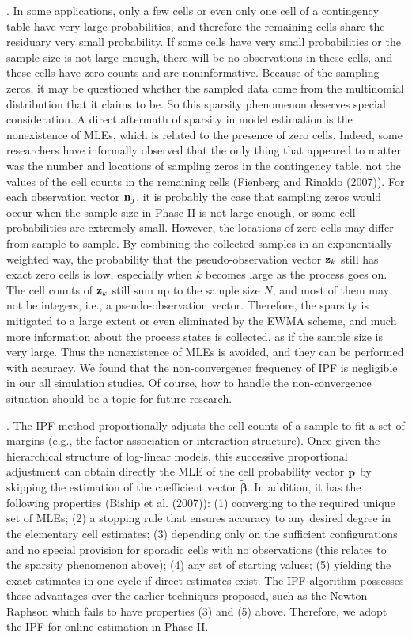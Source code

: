 . In some applications, only a few cells or even only one
cell of a contingency table have very large probabilities, and therefore the
remaining cells share the residuary very small probability. If some cells have very
small probabilities or the sample size is not large enough, there will be no
observations in these cells, and these cells have zero counts and are
noninformative. Because of the sampling zeros, it may be questioned whether the
sampled data come from the multinomial distribution that it claims to be. So this
sparsity phenomenon deserves special consideration. A direct aftermath of sparsity
in model estimation is the nonexistence of MLEs, which is related to the presence of
zero cells. Indeed, some researchers have informally observed that the only thing
that appeared to matter was the number and locations of sampling zeros in the
contingency table, not the values of the cell counts in the remaining cells
(Fienberg and Rinaldo (2007)). For each observation vector ${\bf n}_j$, it is
probably the case that sampling zeros would occur when the sample size in Phase II
is not large enough, or some cell probabilities are extremely small. However, the
locations of zero cells may differ from sample to sample. By combining the collected
samples in an exponentially weighted way, the probability that the
pseudo-observation vector ${\bf z}_k$ still has exact zero cells is low, especially
when $k$ becomes large as the process goes on. The cell counts of ${\bf z}_k$ still
sum up to the sample size $N$, and most of them may not be integers, i.e., a
pseudo-observation vector. Therefore, the sparsity is mitigated to a large extent or
even eliminated by the EWMA scheme, and much more information about the process
states is collected, as if the sample size is very large. Thus the nonexistence of
MLEs is avoided, and they can be performed with accuracy. We found that the
non-convergence frequency of IPF is negligible in our all simulation studies. Of
course, how to handle the non-convergence situation should be a topic for future
research.

. The IPF method proportionally adjusts the cell counts of a
sample to fit a set of margins (e.g., the factor association or interaction
structure). Once given the hierarchical structure of log-linear models, this
successive proportional adjustment can obtain directly the MLE of the cell
probability vector $\bf p$ by skipping the estimation of the coefficient vector
$\widetilde{\bm\beta}$. In addition, it has the following properties (Biship et al.
(2007)): (1) converging to the required unique set of MLEs; (2) a stopping rule that
ensures accuracy to any desired degree in the elementary cell estimates; (3)
depending only on the sufficient configurations and no special provision for
sporadic cells with no observations (this relates to the sparsity phenomenon above);
(4) any set of starting values; (5) yielding the exact estimates in one cycle if
direct estimates exist. The IPF algorithm possesses these advantages over the
earlier techniques proposed, such as the Newton-Raphson which fails to have
properties (3) and (5) above. Therefore, we adopt the IPF for online estimation in
Phase II.



